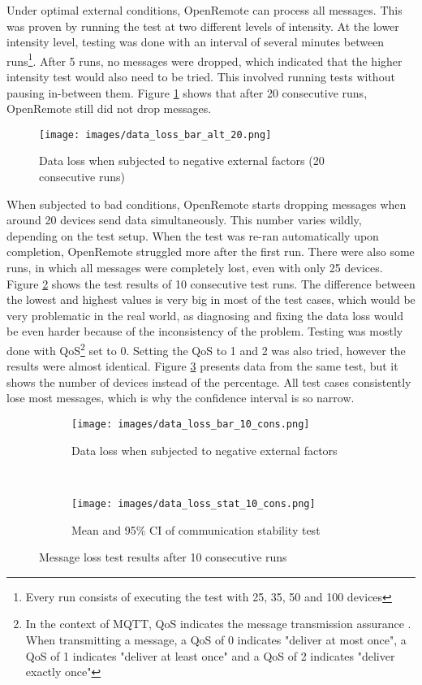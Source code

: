 Under optimal external conditions, OpenRemote can process all messages. This was proven by running the test at two different levels of intensity. At the lower intensity level, testing was done with an interval of several minutes between runs\footnote{Every run consists of executing the test with 25, 35, 50 and 100 devices}. After 5 runs, no messages were dropped, which indicated that the higher intensity test would also need to be tried. This involved running tests without pausing in-between them. Figure \ref{fig:data_loss_bar_alt_20} shows that after 20 consecutive runs, OpenRemote still did not drop messages.

\begin{figure}[ht]
    \centering
    \texttt{[image: images/data\_loss\_bar\_alt\_20.png]}
    \caption{Data loss when subjected to negative external factors (20 consecutive runs)}
    \label{fig:data_loss_bar_alt_20}
\end{figure}

When subjected to bad conditions, OpenRemote starts dropping messages when around 20 devices send data simultaneously. This number varies wildly, depending on the test setup. When the test was re-ran automatically upon completion, OpenRemote struggled more after the first run. There were also some runs, in which all messages were completely lost, even with only 25 devices. Figure \ref{fig:data_los_iter} shows the test results of 10 consecutive test runs. The difference between the lowest and highest values is very big in most of the test cases, which would be very problematic in the real world, as diagnosing and fixing the data loss would be even harder because of the inconsistency of the problem. Testing was mostly done with QoS\footnote{In the context of MQTT, QoS indicates the message transmission assurance \cite{rfc9431}. When transmitting a message, a QoS of 0 indicates "deliver at most once", a QoS of 1 indicates "deliver at least once" and a QoS of 2 indicates "deliver exactly once"} set to 0. Setting the QoS to 1 and 2 was also tried, however the results were almost identical. Figure \ref{fig:data_loss_stat_10_cons} presents data from the same test, but it shows the number of devices instead of the percentage. All test cases consistently lose most messages, which is why the confidence interval is so narrow.

\begin{figure*}[ht]
    \centering
	\begin{subfigure}[t]{0.5\textwidth}
		\centering
    	\texttt{[image: images/data\_loss\_bar\_10\_cons.png]}
    	\caption{Data loss when subjected to negative external factors}
    	\label{fig:data_los_iter}
	\end{subfigure}%
	~
	\begin{subfigure}[t]{0.5\textwidth}
		\centering
		\texttt{[image: images/data\_loss\_stat\_10\_cons.png]}
		\caption{Mean and 95\% CI of communication stability test}
		\label{fig:data_loss_stat_10_cons}
	\end{subfigure}
	\caption{Message loss test results after 10 consecutive runs}
	\label{fig:data_loss_stat_10_both}
\end{figure*}

